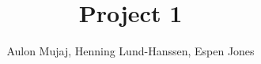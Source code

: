 \documentclass[UKenglish]{article}  %
\title{Project 1}        %
\author{Aulon Mujaj, Henning Lund-Hanssen, Espen Jones}                      %
\begin{document}
\maketitle{}



\end{document}

